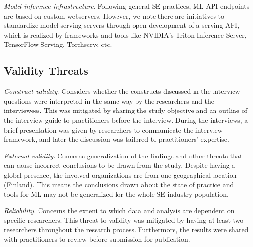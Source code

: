 

\textit{Model inference infrastructure.} Following general SE practices, ML API endpoints are based on custom webservers. However, we note there are initiatives to standardize model serving servers through open development of a serving API, which is realized by frameworks and tools like NVIDIA's Triton Inference Server, TensorFlow Serving, Torchserve etc.

\subsection{Validity Threats}

\textit{Construct validity.} Considers whether the constructs discussed in the interview questions were interpreted in the same way by the researchers and the interviewees. This was mitigated by sharing the study objective and an outline of the interview guide to practitioners before the interview. During the interviews, a brief presentation was given by researchers to communicate the interview framework, and later the discussion was tailored to practitioners' expertise.


\textit{External validity.} Concerns generalization of the findings and other threats that can cause incorrect conclusions to be drawn from the study. Despite having a global presence, the involved organizations are from one geographical location (Finland). This means the conclusions drawn about the state of practice and tools for ML may not be generalized for the whole SE industry population. 

\textit{Reliability.} Concerns the extent to which data and analysis are dependent on specific researchers. This threat to validity was mitigated by having at least two researchers throughout the research process. Furthermore, the results were shared with practitioners to review before submission for publication.


